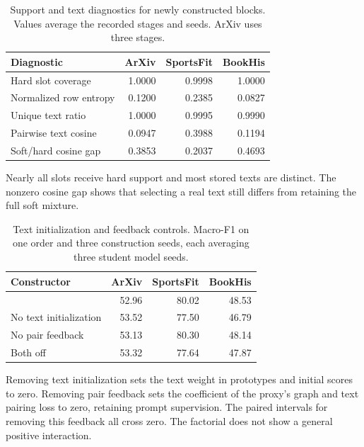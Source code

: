 \begin{table}[H]
\centering
\footnotesize
\caption{Support and text diagnostics for newly constructed blocks. Values average the recorded stages and seeds. ArXiv uses three stages.}
\label{tab:support_diagnostics}
\begin{tabular*}{\linewidth}{@{\extracolsep{\fill}}lrrr@{}}
\toprule
Diagnostic & ArXiv & SportsFit & BookHis\\
\midrule
Hard slot coverage & 1.0000 & 0.9998 & 1.0000\\
Normalized row entropy & 0.1200 & 0.2385 & 0.0827\\
Unique text ratio & 1.0000 & 0.9995 & 0.9990\\
Pairwise text cosine & 0.0947 & 0.3988 & 0.1194\\
Soft/hard cosine gap & 0.3853 & 0.2037 & 0.4693\\
\bottomrule
\end{tabular*}
\end{table}

Nearly all slots receive hard support and most stored texts are distinct.
The nonzero cosine gap shows that selecting a real text still differs from
retaining the full soft mixture.

\begin{table}[H]
\centering
\footnotesize
\caption{Text initialization and feedback controls. Macro-F1 on one order
and three construction seeds, each averaging three student model seeds.}
\label{tab:text_feedback}
\begin{tabular*}{\linewidth}{@{\extracolsep{\fill}}lrrr@{}}
\toprule
Constructor & ArXiv & SportsFit & BookHis\\
\midrule
\method{} & 52.96 & 80.02 & 48.53\\
No text initialization & 53.52 & 77.50 & 46.79\\
No pair feedback & 53.13 & 80.30 & 48.14\\
Both off & 53.32 & 77.64 & 47.87\\
\bottomrule
\end{tabular*}
\end{table}

Removing text initialization sets the text weight in prototypes and initial
scores to zero. Removing pair feedback sets the coefficient of the proxy's
graph and text pairing loss to zero, retaining prompt supervision.
The paired intervals for removing this feedback all cross zero.
The factorial does not show a general positive interaction.


